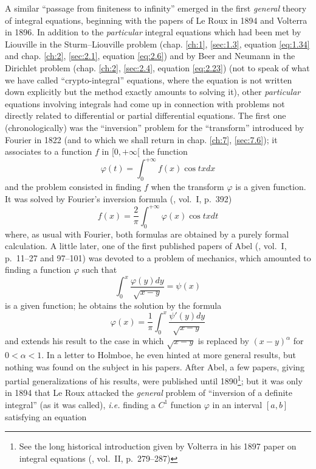 \documentclass[12pt,a4paper,leqno,twoside]{extbook}
\begin{document}
A similar ``passage from finiteness to infinity'' emerged in the first \emph{general} theory of integral equations, beginning with the papers of Le Roux in 1894 and Volterra in 1896. In addition to the \emph{particular} integral equations which had been met by Liouville in the Sturm--Liouville problem (chap. \ref{ch:1}, \ref{sec:1.3}, equation \eqref{eq:1.34} and chap. \ref{ch:2}, \ref{sec:2.1}, equation \ref{eq:2.6}) and by Beer and Neumann in the Dirichlet problem (chap. \ref{ch:2}, \ref{sec:2.4}, equation \eqref{eq:2.23}) (not to speak of what we have called ``crypto-integral'' equations, where the equation is not written down explicitly but the method exactly amounts to solving it), other \emph{particular} equations involving integrals had come up in connection with problems not directly related to differential or partial differential equations. The first one (chronologically) was the ``inversion'' problem for the ``transform'' introduced by Fourier in 1822 (and to which we shall return in chap. \ref{ch:7}, \ref{sec:7.6}); it associates to a function \(f\) in \([0, +\infty[\) the function
\begin{equation}
    \label{eq:4.14}
    \varphi(t) = \int_0^{+\infty} f(x)\cos{tx}dx
\end{equation}
and the problem consisted in finding \(f\) when the transform \(\varphi\) is a given function. It was solved by Fourier's inversion formula (\cite{067}, vol.~I, p.~392)
\begin{equation}
    \label{eq:4.15}
    f(x) = \frac{2}{\pi} \int_0^{+\infty} \varphi(x)\cos{tx}dt
\end{equation}
where, as usual with Fourier, both formulas are obtained by a purely formal calculation. A little later, one of the first published papers of Abel (\cite{001}, vol.~I, p.~11--27 and 97--101) was devoted to a problem of mechanics, which amounted to finding a function \(\varphi\) such that
\begin{equation}
    \label{eq:4.16}
    \int_0^x \frac{\varphi(y)dy}{\sqrt{x-y}} = \psi(x)
\end{equation}
is a given function; he obtains the solution by the formula
\begin{equation}
    \label{eq:4.17}
    \varphi(x) = \frac{1}{\pi} \int_0^x \frac{\psi'(y)dy}{\sqrt{x - y}}
\end{equation}
and extends his result to the case in which \(\sqrt{x - y}\) is replaced by \((x-y)^\alpha\) for \(0 < \alpha < 1\). In a letter to Holmboe, he even hinted at more general results, but nothing was found on the subject in his papers. After Abel, a few papers, giving partial generalizations of his results, were published until 1890\footnote{See the long historical introduction given by Volterra in his 1897 paper on integral equations (\cite{219}, vol.~II, p.~279--287)}; but it was only in 1894 that Le Roux attacked the \emph{general} problem of ``inversion of a definite integral'' (as it was called), \emph{i.e.} finding a \(C^1\) function \(\varphi\) in an interval \([a,b]\) satisfying an equation
\end{document}
